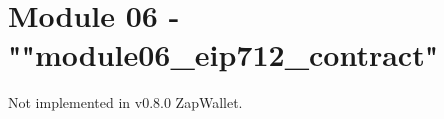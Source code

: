 \newpage
\section{Module 06 - {\ttfamily ""module06\_eip712\_contract"}}
\label{sec:module06_predicate}

Not implemented in v0.8.0 ZapWallet.

